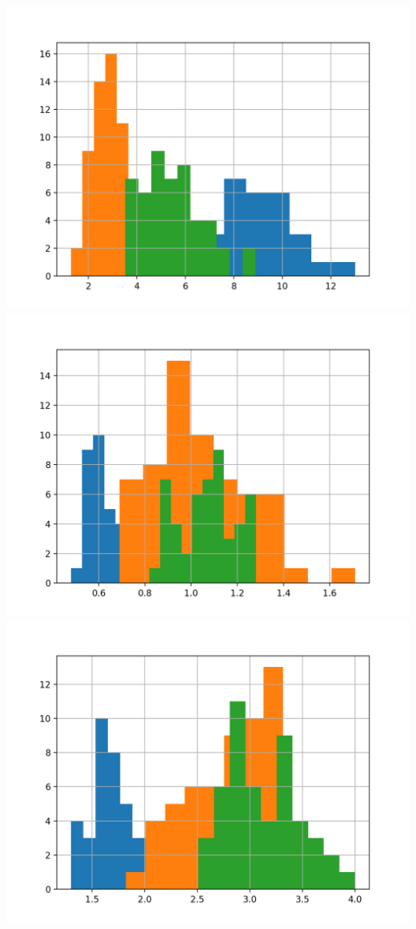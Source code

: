 \documentclass{article}
\begin{document}
\includegraphics[width=\textwidth]{v10.png}\\
\includegraphics[width=\textwidth]{v11.png}\\
\includegraphics[width=\textwidth]{v12.png}\\
\end{document}
